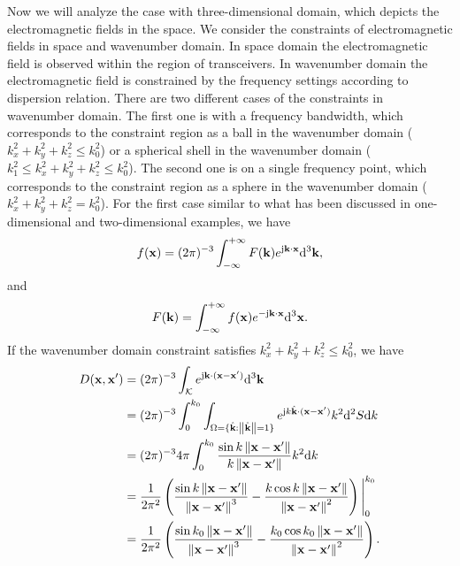 \documentclass[12pt,draftclsnofoot,journal,onecolumn]{IEEEtran}
\begin{document}
	Now we will analyze the case with three-dimensional domain, which depicts the electromagnetic fields in the space. We consider the constraints of electromagnetic fields in space and wavenumber domain. In space domain the electromagnetic field is observed within the region of transceivers. In wavenumber domain the electromagnetic field is constrained by the frequency settings according to dispersion relation. There are two different cases of the constraints in wavenumber domain. The first one is with a frequency bandwidth, which corresponds to the constraint region as a ball in the wavenumber domain ($k_x^2+k_y^2+k_z^2 \leqslant k_0^2$) or a spherical shell in the wavenumber domain ($k_1^2 \leqslant k_x^2+k_y^2+k_z^2 \leqslant k_0^2$). The second one is on a single frequency point, which corresponds to the constraint region as a sphere in the wavenumber domain ($k_x^2+k_y^2+k_z^2=k_0^2$).  For the first case similar to what has been discussed in one-dimensional and two-dimensional examples, we have 
	\begin{equation}
		\begin{aligned}
			f({\bf x})=(2\pi)^{-3}\int_{-\infty}^{+\infty}F({\bf k})e^{{\rm j}{\bf k}\cdot {\bf x}}{\rm d}^3{\bf k},
		\end{aligned}
	\end{equation}
	and
	\begin{equation}
		\begin{aligned}
			F({\bf k}) = \int_{-\infty}^{+\infty}f({\bf x})e^{-{\rm j}{\bf k}\cdot {\bf x}}{\rm d}^3{\bf x}.
		\end{aligned}
	\end{equation}
	If the wavenumber domain constraint satisfies $k_x^2+k_y^2+k_z^2 \leqslant k_0^2$, we have 
	\begin{equation}
		\begin{aligned}
			D({\bf x},{\bf x}') &= (2\pi)^{-3}\int_{\mathcal{K}} e^{{\rm j}{\bf k}\cdot({\bf x}-{\bf x}')}{\rm d}^3{\bf k} \\&= (2\pi)^{-3} \int_{0}^{k_0} \int_{{\Omega}=\{\hat{\bf k}: \left\| \hat{\bf k} \right\|=1\}} e^{{\rm j}k\hat{\bf k}\cdot({\bf x}-{\bf x}')}k^2{\rm d}^2S{\rm d}k
			\\& = (2\pi)^{-3} 4\pi \int_0^{k_0} \frac{\sin k \left\| {\bf x}-{\bf x}' \right\|}{k \left\| {\bf x}-{\bf x}' \right\|}k^2 {\rm d}k
			\\& = \frac{1}{2\pi^2} \left( \frac{\sin k\left\| {\bf x}-{\bf x}' \right\|}{\left\| {\bf x}-{\bf x}' \right\|^3}-\frac{k\cos k\left\| {\bf x}-{\bf x}' \right\|}{\left\| {\bf x}-{\bf x}' \right\|^2} \right) \Bigg|_0^{k_0}
			\\& = \frac{1}{2\pi^2} \left( \frac{\sin k_0\left\| {\bf x}-{\bf x}' \right\|}{\left\| {\bf x}-{\bf x}' \right\|^3}-\frac{k_0\cos k_0\left\| {\bf x}-{\bf x}' \right\|}{\left\| {\bf x}-{\bf x}' \right\|^2} \right).
		\end{aligned}
		\label{equ_ball}
	\end{equation}
\end{document}
